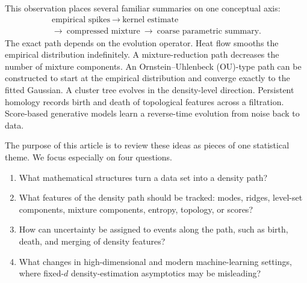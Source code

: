 \documentclass[preprint]{imsart}
\theoremstyle{plain}
\theoremstyle{definition}
\begin{document}
This observation places several familiar summaries on one conceptual axis:
\[
\begin{array}{c}
\text{empirical spikes}\ \rightarrow\ \text{kernel estimate}\\[2pt]
\rightarrow\ \text{compressed mixture}\ \rightarrow\ \text{coarse parametric summary}.
\end{array}
\]
The exact path depends on the evolution operator. Heat flow smooths the empirical distribution indefinitely. A mixture-reduction path decreases the number of mixture components. An Ornstein--Uhlenbeck (OU)-type path can be constructed to start at the empirical distribution and converge exactly to the fitted Gaussian. A cluster tree evolves in the density-level direction. Persistent homology records birth and death of topological features across a filtration. Score-based generative models learn a reverse-time evolution from noise back to data.



The purpose of this article is to review these ideas as pieces of one statistical theme. We focus especially on four questions.
\begin{enumerate}
\item What mathematical structures turn a data set into a density path?
\item What features of the density path should be tracked: modes, ridges, level-set components, mixture components, entropy, topology, or scores?
\item How can uncertainty be assigned to events along the path, such as birth, death, and merging of density features?
\item What changes in high-dimensional and modern machine-learning settings, where fixed-$d$ density-estimation asymptotics may be misleading?
\end{enumerate}
\end{document}
